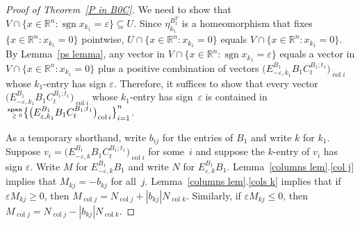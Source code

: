 \documentclass{amsart}
\theoremstyle{definition}
\theoremstyle{remark}
\numberwithin{equation}{section}
\newcommand{\reals}{\mathbb R}
\newcommand{\ep}{\varepsilon}
\newcommand{\col}{\operatorname{col}}
\newcommand{\sgn}{\operatorname{sgn}}
\newcommand{\nnspan}{{\!\!\tiny\begin{array}{r}\mathbf{span}\\\ge0\end{array}\hspace*{-0.57em}}}
\newcommand{\set}[1]{{\lbrace #1 \rbrace}}
\newcommand{\sett}[1]{{\bigl\lbrace #1 \bigr\rbrace}}
\newcommand{\0}{{\mathbf{0}}}
\begin{document}
\begin{proof}[Proof of Theorem~\ref{P in B0C}]
We need to show that $V\cap\set{x\in\reals^n:\sgn x_{k_1}=\ep}\subseteq U$.
Since $\eta_{k_1}^{B_1^T}$ is a homeomorphism that fixes $\set{x\in\reals^n:x_{k_1}=0}$ pointwise, $U\cap\set{x\in\reals^n:x_{k_1}=0}$ equals $V\cap\set{x\in\reals^n:x_{k_1}=0}$.
By Lemma~\ref{ps lemma}, any vector in $V\cap\set{x\in\reals^n:\sgn x_{k_1}=\ep}$ equals a vector in $V\cap\set{x\in\reals^n:x_{k_1}=0}$ plus a positive combination of vectors $\bigl(E^{B_1}_{-\ep,k_1}B_1C_t^{B_1;t_1}\bigr)_{\col i}$ whose $k_1$-entry has sign $\ep$.
Therefore, it suffices to show that every vector $\bigl(E^{B_1}_{-\ep,k_1}B_1C_t^{B_1;t_1}\bigr)_{\col i}$ whose $k_1$-entry has sign~$\ep$ is contained in $\nnspan\sett{\bigl(E^{B_1}_{\ep,k_1}B_1C_t^{B_1;t_1}\bigr)_{\col i}}_{i=1}^n$.

As a temporary shorthand, write $b_{ij}$ for the entries of $B_1$ and write $k$ for $k_1$.
Suppose $v_i=\bigl(E^{B_1}_{-\ep,k}B_1C_t^{B_1;t_1}\bigr)_{\col i}$ for some~$i$ and suppose the $k$-entry of $v_i$ has sign $\ep$.
Write $M$ for $E^{B_1}_{-\ep,k}B_1$ and write $N$ for $E^{B_1}_{\ep,k}B_1$.
Lemma~\ref{columns lem}.\ref{col j} implies that $M_{kj}=-b_{kj}$ for all~$j$.
Lemma~\ref{columns lem}.\ref{cols k} implies that if $\ep M_{kj}\ge0$, then $M_{\col j}=N_{\col j}+|b_{kj}|N_{\col k}$.
Similarly, if $\ep M_{kj}\le0$, then $M_{\col j}=N_{\col j}-|b_{kj}|N_{\col k}$.



\end{proof}
\end{document}
